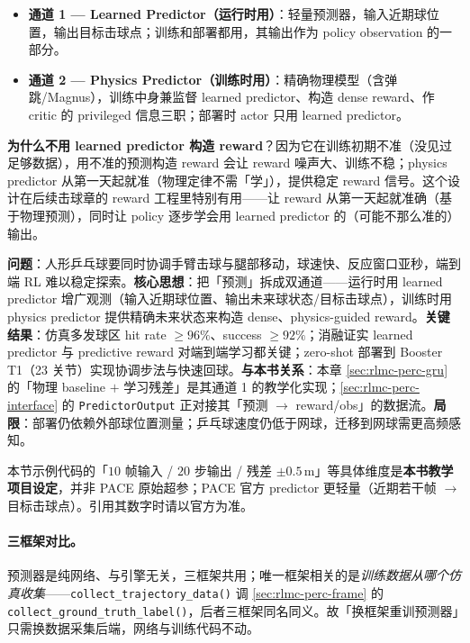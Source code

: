 \begin{itemize}
  \item \textbf{通道 1 — Learned Predictor（运行时用）}：轻量预测器，输入近期球位置，输出目标击球点；训练和部署都用，其输出作为 policy observation 的一部分。
  \item \textbf{通道 2 — Physics Predictor（训练时用）}：精确物理模型（含弹跳/Magnus），训练中身兼监督 learned predictor、构造 dense reward、作 critic 的 privileged 信息三职；部署时 actor 只用 learned predictor。
\end{itemize}

\textbf{为什么不用 learned predictor 构造 reward}？因为它在训练初期不准（没见过足够数据），用不准的预测构造 reward 会让 reward 噪声大、训练不稳；physics predictor 从第一天起就准（物理定律不需「学」），提供稳定 reward 信号。这个设计在后续击球章的 reward 工程里特别有用——让 reward 从第一天起就准确（基于物理预测），同时让 policy 逐步学会用 learned predictor 的（可能不那么准的）输出。

\begin{paper}\label{paper:rlmc-perc-pace}
\textbf{问题}：人形乒乓球要同时协调手臂击球与腿部移动，球速快、反应窗口亚秒，端到端 RL 难以稳定探索。\textbf{核心思想}：把「预测」拆成双通道——运行时用 learned predictor 增广观测（输入近期球位置、输出未来球状态/目标击球点），训练时用 physics predictor 提供精确未来状态来构造 dense、physics-guided reward。\textbf{关键结果}\cite{tennis_pace2025}：仿真多发球区 hit rate $\ge 96\%$、success $\ge 92\%$；消融证实 learned predictor 与 predictive reward 对端到端学习都关键；zero-shot 部署到 Booster T1（23 关节）实现协调步法与快速回球。\textbf{与本书关系}：本章 \cref{sec:rlmc-perc-gru} 的「物理 baseline $+$ 学习残差」是其通道 1 的教学化实现；\cref{sec:rlmc-perc-interface} 的 \verb|PredictorOutput| 正对接其「预测 $\to$ reward/obs」的数据流。\textbf{局限}：部署仍依赖外部球位置测量；乒乓球速度仍低于网球，迁移到网球需更高频感知。
\end{paper}

\begin{finenote}
本节示例代码的「$10$ 帧输入 / $20$ 步输出 / 残差 $\pm 0.5$\,m」等具体维度是\textbf{本书教学项目设定}，并非 PACE 原始超参；PACE 官方 predictor 更轻量（近期若干帧 $\to$ 目标击球点）。引用其数字时请以官方为准。
\end{finenote}

\paragraph{三框架对比。}预测器是纯网络、与引擎无关，三框架共用；唯一框架相关的是\emph{训练数据从哪个仿真收集}——\verb|collect_trajectory_data()| 调 \cref{sec:rlmc-perc-frame} 的 \verb|collect_ground_truth_label()|，后者三框架同名同义。故「换框架重训预测器」只需换数据采集后端，网络与训练代码不动。

